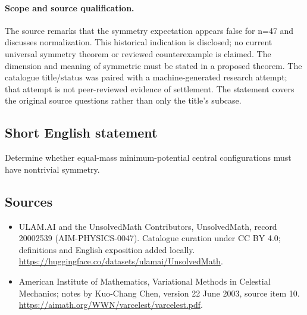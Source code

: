 \documentclass[11pt]{article}
\begin{document}
\paragraph{Scope and source qualification.}The source remarks that the symmetry expectation appears false for n=47 and discusses normalization. This historical indication is disclosed; no current universal symmetry theorem or reviewed counterexample is claimed. The dimension and meaning of symmetric must be stated in a proposed theorem. The catalogue title/status was paired with a machine-generated research attempt; that attempt is not peer-reviewed evidence of settlement. The statement covers the original source questions rather than only the title’s subcase.
\subsection{Short English statement}
Determine whether equal-mass minimum-potential central configurations must have nontrivial symmetry.
\subsection{Sources}
\begin{itemize}
\item[\hypertarget{source:20002539:1}{S1}] ULAM.AI and the UnsolvedMath Contributors, UnsolvedMath, record 20002539 (AIM-PHYSICS-0047). Catalogue curation under CC BY 4.0; definitions and English exposition added locally.
\url{https://huggingface.co/datasets/ulamai/UnsolvedMath}.
\item[\hypertarget{source:20002539:2}{S2}] American Institute of Mathematics, Variational Methods in Celestial Mechanics; notes by Kuo-Chang Chen, version 22 June 2003, source item 10.
\url{https://aimath.org/WWN/varcelest/varcelest.pdf}.
\end{itemize}
\label{end:20002539}
\end{document}
